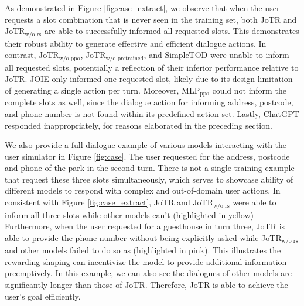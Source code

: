 \documentclass[letterpaper]{article} %
\begin{document}

As demonstrated in Figure \ref{fig:case_extract}, we observe that when the user requests a slot combination that is never seen in the training set, both JoTR and JoTR$_\text{w/o rs}$ are able to successfully informed all requested slots. This demonstrates their robust ability to generate effective and efficient dialogue actions. 
In contrast, JoTR$_\text{w/o ppo}$, JoTR$_\text{w/o pretrained}$, and SimpleTOD were unable to inform all requested slots, potentially a reflection of their inferior performance relative to JoTR.
JOIE only informed one requested slot, likely due to its design limitation of generating a single action per turn. 
Moreover, MLP$_{\text{ppo}}$ could not inform the complete slots as well, since the dialogue action for informing address, postcode, and phone number is not found within its predefined action set.
Lastly, ChatGPT responded inappropriately, for reasons elaborated in the preceding section.  

We also provide a full dialogue example of various models interacting with the user simulator in Figure \ref{fig:case}. The user requested for the address, postcode and phone of the park in the second turn. There is not a single training example that request these three slots simultaneously, which serves to showcase ability of different models to respond with complex and out-of-domain user actions. In consistent with Figure \ref{fig:case_extract}, JoTR and JoTR$_{\text{w/o rs}}$ were able to inform all three slots while other models can't (highlighted in yellow) Furthermore, when the user requested for a guesthouse in turn three, JoTR is able to provide the phone number without being explicitly asked while JoTR$_{\text{w/o rs}}$ and other models failed to do so as (highlighted in pink). This illustrates the rewarding shaping can incentivize the model to provide additional information preemptively. In this example, we can also see the dialogues of other models are significantly longer than those of JoTR. Therefore, JoTR is able to achieve the user's goal efficiently.
\end{document}

